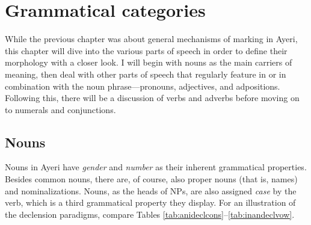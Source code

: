 
\chapter{Grammatical categories}
\label{ch:gramcat}

While the previous chapter was about general mechanisms of marking in Ayeri, 
this chapter will dive into the various parts of speech in order to define 
their morphology with a closer look. I will begin with nouns as the main 
carriers of meaning, then deal with other parts of speech that regularly 
feature in or in combination with the noun phrase---pronouns, adjectives, and 
adpositions. Following this, there will be a discussion of verbs and adverbs 
before moving on to numerals and conjunctions.

\section{Nouns}
\label{sec:nouns}

Nouns in Ayeri have \emph{gender} and \emph{number} as their inherent
grammatical properties. Besides common nouns, there are, of course, also proper
nouns (that is, names) and nominalizations. Nouns, as the heads of NPs, are
also assigned \emph{case} by the verb, which is a third grammatical property
they display. For an illustration of the declension paradigms, compare Tables
\ref{tab:anideclcons}–\ref{tab:inandeclvow}.


